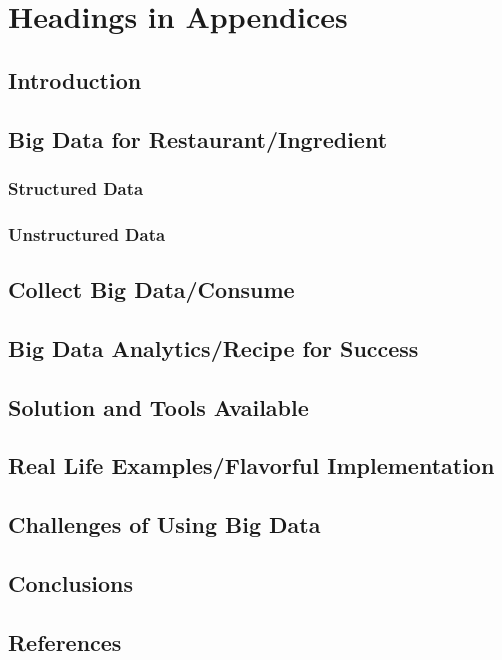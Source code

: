 \documentclass[sigconf]{acmart}
\begin{document}
\appendix

\section{Headings in Appendices}

\subsection{Introduction}
\subsection{Big Data for Restaurant/Ingredient}
\subsubsection{Structured Data}
\subsubsection{Unstructured Data}
\subsection{Collect Big Data/Consume}
\subsection{Big Data Analytics/Recipe for Success}
\subsection{Solution and Tools Available}
\subsection{Real Life Examples/Flavorful Implementation}
\subsection{Challenges of Using Big Data}
\subsection{Conclusions}
\subsection{References}



 
\end{document}
